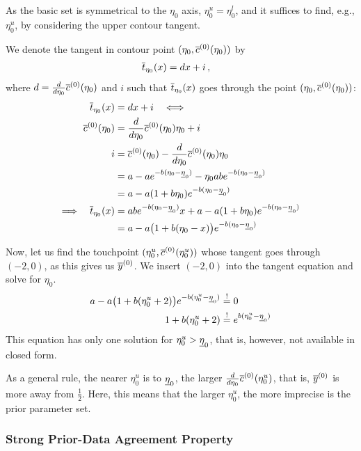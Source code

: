 As the basic set is symmetrical to the $\eta_0$ axis, $\eta_0^u = \eta_0^l$,
and it suffices to find, e.g., $\eta_0^u$, by considering the upper contour tangent.

We denote the tangent in contour point $(\eta_0,\overline{c}^{(0)}(\eta_0))$ by
\begin{align*}
\overline{t}_{\eta_0}(x) &= dx + i\,,
\end{align*}
where $d = \frac{d}{d\eta_0} \overline{c}^{(0)}(\eta_0)$ and
$i$ such that $\overline{t}_{\eta_0}(x)$ goes through the point $(\eta_0,\overline{c}^{(0)}(\eta_0))$:
\begin{align*}
\overline{t}_{\eta_0}(x) &= dx + i \quad \Longleftrightarrow\\
\overline{c}^{(0)}(\eta_0) &= \frac{d}{d\eta_0} \overline{c}^{(0)}(\eta_0) \eta_0 + i \\
i &= \overline{c}^{(0)}(\eta_0) -\frac{d}{d\eta_0} \overline{c}^{(0)}(\eta_0) \eta_0 \\
  &= a - a e^{-b(\eta_0 - \underline{\eta}_0)} - \eta_0 ab e^{-b(\eta_0 - \underline{\eta}_0)} \\
  &= a - a (1 + b \eta_0) e^{-b(\eta_0 - \underline{\eta}_0)} \\
\Longrightarrow\quad
\overline{t}_{\eta_0}(x) &= ab e^{-b(\eta_0 - \underline{\eta}_0)} x + a - a (1 + b \eta_0) e^{-b(\eta_0 - \underline{\eta}_0)} \\
                   &= a - a \big(1 + b(\eta_0-x)\big) e^{-b(\eta_0 - \underline{\eta}_0)}
\end{align*}

Now, let us find the touchpoint $(\eta_0^u, \overline{c}^{(0)}(\eta_0^u))$ whose tangent goes through $(-2,0)$, as this gives us $\overline{y}^{(0)}$.
We insert $(-2,0)$ into the tangent equation and solve for $\eta_0$.
\begin{align}
a - a \big(1 + b(\eta_0^u + 2)\big) e^{-b(\eta_0^u - \underline{\eta}_0)} &\stackrel{!}{=} 0 \nonumber\\
1 + b(\eta_0^u + 2) &\stackrel{!}{=} e^{b(\eta_0^u - \underline{\eta}_0)} \label{eq:eta0u}
\end{align}
This equation has only one solution for $\eta_0^u > \underline{\eta}_0$, that is,
however, not available in closed form.

As a general rule, the nearer $\eta_0^u$ is to $\underline{\eta}_0$, the larger $\frac{d}{d\eta_0} \overline{c}^{(0)}(\eta_0^u)$,
that is, $\overline{y}^{(0)}$ %
is more away from $\frac{1}{2}$.
Here, this means that the larger $\eta_0^u$, the more imprecise is the prior parameter set.


\subsubsection{Strong Prior-Data Agreement Property}
\label{sec:spda-property}

